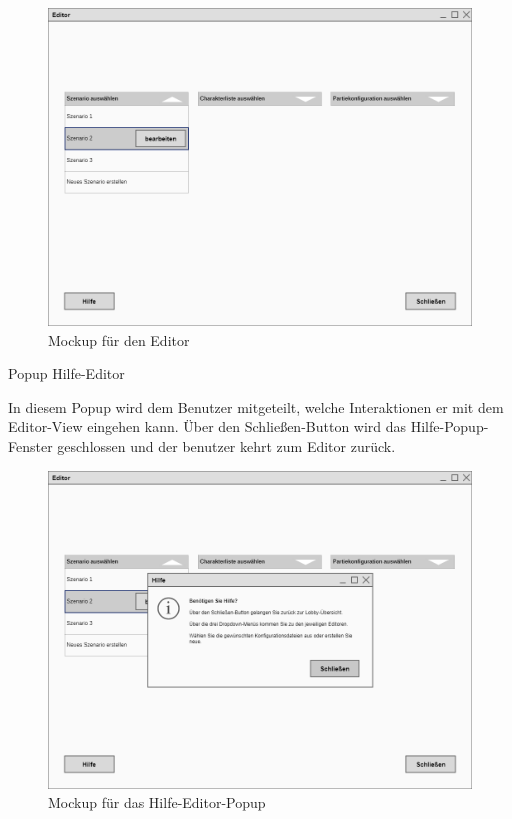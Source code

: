 \begin{figure}
  \centering
  \includegraphics[width=\textwidth]{Meilenstein03/Editor_Mockup.png}
  \caption{Mockup für den Editor}
\end{figure}

Popup \glqq{}Hilfe-Editor\grqq{}

In diesem Popup wird dem Benutzer mitgeteilt, welche Interaktionen er mit dem Editor-View eingehen kann. Über den Schließen-Button wird das Hilfe-Popup-Fenster geschlossen und der benutzer kehrt zum Editor zurück.

\begin{figure}
  \centering
  \includegraphics[width=\textwidth]{Meilenstein03/Hilfe-Editor_Mockup.png}
  \caption{Mockup für das Hilfe-Editor-Popup}
\end{figure}

